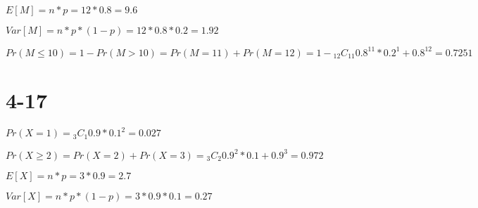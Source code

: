 \documentclass[12pt]{article}
\begin{document}
\begin{spacing}{2.0}
$E[M]=n*p= 12*0.8= 9.6$

$Var[M]= n*p*(1-p)= 12*0.8*0.2=1.92$

$Pr(M \le 10)= 1- Pr(M> 10) =  Pr(M=11)+ Pr(M=12)= 1- {}_{12}C_{11} 0.8^{11}*0.2^{1} + 0.8^{12}  =0.7251 $

\section*{4-17}

$Pr(X=1)= {}_{3}C_{1} 0.9*0.1^2 = 0.027$

$Pr(X\ge2)= Pr(X=2)+ Pr(X=3)={}_{3}C_{2} 0.9^2*0.1 + 0.9^3 = 0.972$

$E[X]= n*p= 3*0.9=2.7$

$Var[X]= n*p*(1-p)= 3*0.9*0.1= 0.27$


\end{spacing}
\end{document}
